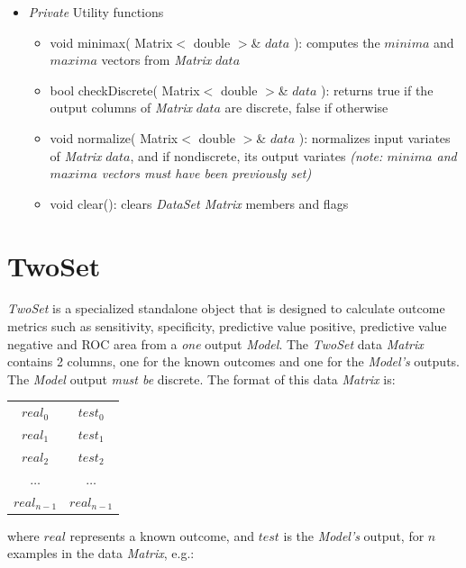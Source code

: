 \documentclass{report}
\begin{document}
\begin{itemize}
\item {\em Private} Utility functions

\begin{itemize}
\item void minimax( Matrix$<$ double $>$\& $data$ ): computes the
      $minima$ and $maxima$ vectors from {\em Matrix} $data$
\item bool checkDiscrete( Matrix$<$ double $>$\& $data$ ): returns
      true if the output columns of {\em Matrix} $data$ are discrete,
      false if otherwise
\item void normalize( Matrix$<$ double $>$\& $data$ ): normalizes
      input variates of {\em Matrix} $data$, and if nondiscrete, its
      output variates {\em (note: $minima$ and $maxima$ vectors must
      have been previously set)}
\item void clear(): clears {\em DataSet Matrix} members and flags
\end{itemize}

\end{itemize}

\section{TwoSet}

{\em TwoSet} is a specialized standalone object that is designed to
calculate outcome metrics such as sensitivity, specificity, predictive
value positive, predictive value negative and ROC area from a {\em
one} output {\em Model}. The {\em TwoSet} data {\em Matrix} contains 2
columns, one for the known outcomes and one for the {\em Model's}
outputs.  The {\em Model} output {\em must be} discrete.  The format
of this data {\em Matrix} is:

\begin{center}
\begin{tabular}{cc}
$real_0$ & $test_0$ \\
$real_1$ & $test_1$ \\
$real_2$ & $test_2$ \\
$\ldots$ & $\ldots$ \\
$real_{n-1}$ & $real_{n-1}$ \\
\end{tabular}
\end{center}

where $real$ represents a known outcome, and $test$ is the {\em
Model's} output, for $n$ examples in the data {\em Matrix}, e.g.:
\end{document}
